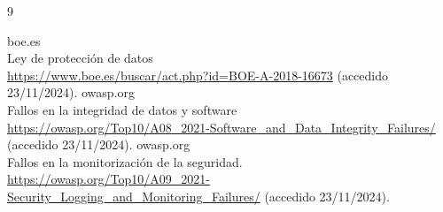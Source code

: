\documentclass[a4paper,12pt]{article}
\begin{document}
\begin{thebibliography}{9}
	
	
	

	 boe.es\\ Ley de protección de datos\\	\url{https://www.boe.es/buscar/act.php?id=BOE-A-2018-16673} (accedido 23/11/2024).
	 owasp.org\\ Fallos en la integridad de datos y software\\	\url{https://owasp.org/Top10/A08_2021-Software_and_Data_Integrity_Failures/} (accedido 23/11/2024).
	 owasp.org\\ Fallos en la monitorización de la seguridad.\\	\url{https://owasp.org/Top10/A09_2021-Security_Logging_and_Monitoring_Failures/} (accedido 23/11/2024).

\end{thebibliography}
\end{document}
